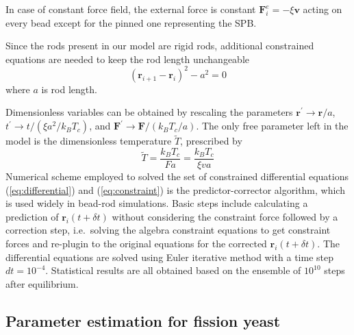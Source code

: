 \documentclass{article}
\begin{document}
In case of constant force field, the external force is constant $\mathbf{F}_i^e = -\xi \mathbf{v}$ acting on every bead except for the pinned one representing the SPB. 

Since the rods present in our model are rigid rods, additional constrained equations are needed to keep the rod length unchangeable
\begin{equation}
	\label{eq:constraint}
	(\mathbf{r}_{i+1} - \mathbf{r}_{i})^2 - a^2 = 0
\end{equation}
where $a$ is rod length. 

Dimensionless variables can be obtained by rescaling the parameters $\mathbf{r}^{\prime}\to \mathbf{r}/a$, $t^{\prime}\to t/(\xi a^2/k_BT_c)$, and $\mathbf{F}^{\prime}\to\mathbf{F}/(k_BT_c/a)$. The only free parameter left in the model is the dimensionless temperature $\tilde{T}$, prescribed by 
\begin{equation}
	\label{eq:Teff}
	\tilde{T} = \frac{k_BT_c}{Fa} = \frac{k_B T_c}{\xi v a}
\end{equation}
Numerical scheme employed to solved the set of constrained differential equations (\ref{eq:differential}) and (\ref{eq:constraint}) is the predictor-corrector algorithm, which is used widely in bead-rod simulations\cite{Cruz2012,Somasi2002,Liu1989}.
Basic steps include calculating a prediction of $\mathbf{r}_i(t+\delta t)$ without considering the constraint force followed by a correction step, i.e.\ solving the algebra constraint equations to get constraint forces and re-plugin to the original equations for the corrected $\mathbf{r}_i(t+\delta t)$.
The differential equations are solved using Euler iterative method with a time step $dt = 10^{-4}$.  Statistical results are all obtained based on the ensemble of $10^{10}$ steps after equilibrium.  

\subsection{Parameter estimation for fission yeast}
\label{sub:estimation}
\end{document}
